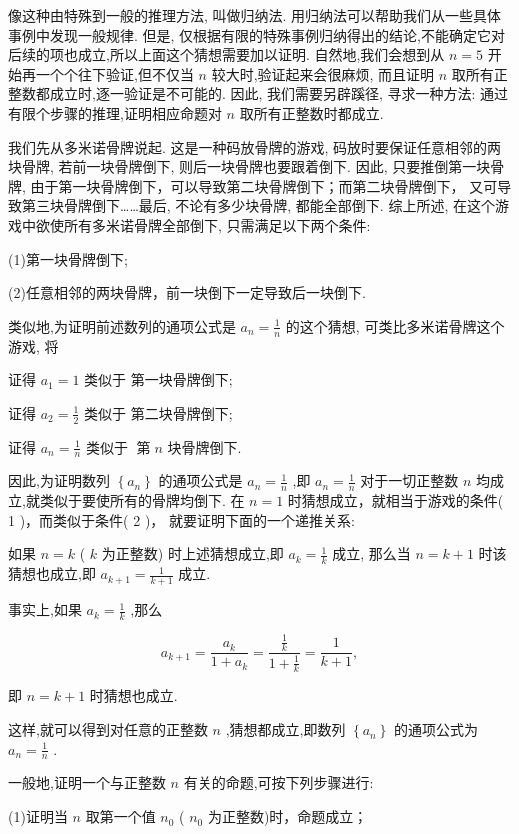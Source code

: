 \documentclass[10pt]{article}
\begin{document}
像这种由特殊到一般的推理方法, 叫做归纳法. 用归纳法可以帮助我们从一些具体事例中发现一般规律. 但是, 仅根据有限的特殊事例归纳得出的结论,不能确定它对后续的项也成立,所以上面这个猜想需要加以证明. 自然地,我们会想到从 \(n = 5\) 开始再一个个往下验证,但不仅当 \(n\) 较大时,验证起来会很麻烦, 而且证明 \(n\) 取所有正整数都成立时,逐一验证是不可能的. 因此, 我们需要另辟蹊径, 寻求一种方法: 通过有限个步骤的推理,证明相应命题对 \(n\) 取所有正整数时都成立.

我们先从多米诺骨牌说起. 这是一种码放骨牌的游戏, 码放时要保证任意相邻的两块骨牌, 若前一块骨牌倒下, 则后一块骨牌也要跟着倒下. 因此, 只要推倒第一块骨牌, 由于第一块骨牌倒下，可以导致第二块骨牌倒下；而第二块骨牌倒下， 又可导致第三块骨牌倒下……最后, 不论有多少块骨牌, 都能全部倒下. 综上所述, 在这个游戏中欲使所有多米诺骨牌全部倒下, 只需满足以下两个条件:

(1)第一块骨牌倒下;

(2)任意相邻的两块骨牌，前一块倒下一定导致后一块倒下.

类似地,为证明前述数列的通项公式是 \({a}_{n} = \frac{1}{n}\) 的这个猜想, 可类比多米诺骨牌这个游戏, 将

证得 \({a}_{1} = 1\) 类似于 第一块骨牌倒下;

证得 \({a}_{2} = \frac{1}{2}\) 类似于 第二块骨牌倒下;

证得 \({a}_{n} = \frac{1}{n}\) 类似于 \(\operatorname{\text{ 第 }}n\) 块骨牌倒下.

因此,为证明数列 \(\left\{  {a}_{n}\right\}\) 的通项公式是 \({a}_{n} = \frac{1}{n}\) ,即 \({a}_{n} = \frac{1}{n}\) 对于一切正整数 \(n\) 均成立,就类似于要使所有的骨牌均倒下. 在 \(n = 1\) 时猜想成立，就相当于游戏的条件( 1 )，而类似于条件( 2 )， 就要证明下面的一个递推关系:

如果 \(n = k\) ( \(k\) 为正整数) 时上述猜想成立,即 \({a}_{k} = \frac{1}{k}\) 成立, 那么当 \(n = k + 1\) 时该猜想也成立,即 \({a}_{k + 1} = \frac{1}{k + 1}\) 成立.

事实上,如果 \({a}_{k} = \frac{1}{k}\) ,那么

\[
{a}_{k + 1} = \frac{{a}_{k}}{1 + {a}_{k}} = \frac{\frac{1}{k}}{1 + \frac{1}{k}} = \frac{1}{k + 1},
\]

即 \(n = k + 1\) 时猜想也成立.

这样,就可以得到对任意的正整数 \(n\) ,猜想都成立,即数列 \(\left\{  {a}_{n}\right\}\) 的通项公式为 \({a}_{n} = \frac{1}{n}\) .

一般地,证明一个与正整数 \(n\) 有关的命题,可按下列步骤进行:

(1)证明当 \(n\) 取第一个值 \({n}_{0}\) ( \({n}_{0}\) 为正整数)时，命题成立；
\end{document}
